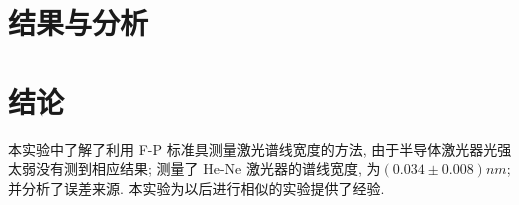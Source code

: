 \documentclass[aps,pre,12pt,preprint,%
	onecolumn,showpacs,showkeys,nofootinbib]{revtex4-2}
\begin{document}
\section{结果与分析}
%	
%	
\section{结论}
本实验中了解了利用 F-P 标准具测量激光谱线宽度的方法, 由于半导体激光器光强太弱没有测到相应结果; 测量了 He-Ne 激光器的谱线宽度, 为$(0.034\pm0.008)nm$; 并分析了误差来源. 本实验为以后进行相似的实验提供了经验.
\end{document}
